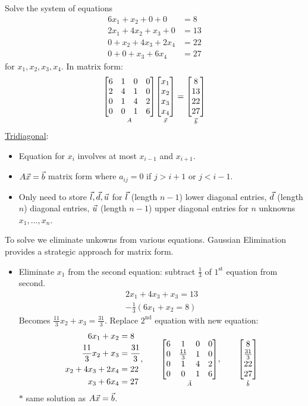 \documentclass[]{article}
\begin{document}
\begin{example}
	Solve the system of equations
	\begin{align*}
		6x_1 + x_2 + 0 + 0 &= 8 \\
		2x_1 + 4x_2 + x_3 +0 &= 13 \\
		0	 + x_2 + 4x_3 + 2x_4 &= 22 \\
		0+0	 + x_3 + 6x_4 &= 27
	\end{align*}
	for $x_1,x_2,x_3,x_4$. In matrix form:
	$$ \underset{A}{\begin{bmatrix}6&1&0&0\\2&4&1&0\\0&1&4&2\\0&0&1&6\end{bmatrix}}\underset{\vec{x}}{\begin{bmatrix}x_1\\x_2\\x_3\\x_4\end{bmatrix}} = \underset{\vec{b}}{\begin{bmatrix}8\\13\\22\\27\end{bmatrix}} $$
	\ul{Tridiagonal}:
	\begin{itemize}
		\item Equation for $x_i$ involves at most $x_{i-1}$ and $x_{i+1}$.
		\item $A\vec{x}=\vec{b}$ matrix form where $a_{ij}=0$ if $j>i+1$ or $j<i-1$.
		\item Only need to store $\vec{l},\vec{d},\vec{u}$ for $\vec{l}$ (length $n-1$) lower diagonal entries, $\vec{d}$ (length $n$) diagonal entries, $\vec{u}$ (length $n-1$) upper diagonal entries for $n$ unknowns $x_1,\dots,x_n$.
	\end{itemize}
	To solve we eliminate unkowns from various equations. Gaussian Elimination provides a strategic approach for matrix form.
	\begin{itemize}
		\item Eliminate $x_1$ from the second equation: subtract $\frac13$ of $1^\text{st}$ equation from second.
			\begin{align*}
				2x_1 + 4x_3 + x_3 = 13 \\
				-\frac13(6x_1+x_2 = 8)
			\end{align*}
			Becomes $\frac{11}3x_2+x_3=\frac{31}3$.
			Replace $2^\text{nd}$ equation with new equation:
			$$\begin{aligned}
				6x_1+x_2 &= 8 \\
				\frac{11}3x_2+ x_3 &= \frac{31}3 \\
				x_2 + 4x_3 + 2x_4 &= 22 \\
				x_3 + 6x_4 &= 27
			\end{aligned}, \qquad
			\underset{\tilde A}{\begin{bmatrix}6&1&0&0\\0&\frac{11}3&1&0\\0&1&4&2\\0&0&1&6\end{bmatrix}}, \qquad \underset{\tilde b}{\begin{bmatrix}8\\\frac{31}3\\22\\27\end{bmatrix}} $$
			$*$ same solution as $A\vec{x}=\vec{b}$.


\end{itemize}
\end{example}
\end{document}
